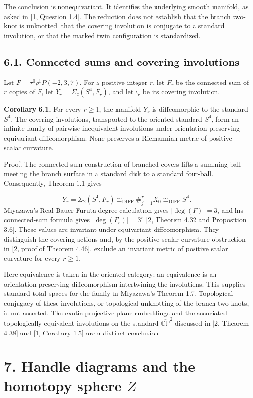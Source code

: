 \documentclass[11pt,letterpaper]{article}
\begin{document}
The conclusion is nonequivariant. It identifies the underlying smooth manifold, as asked in [1, Question 1.4]. The reduction does not establish that the branch two-knot is unknotted, that the covering involution is conjugate to a standard involution, or that the marked twin configuration is standardized.

\subsection*{6.1. Connected sums and covering involutions}
Let $F=\tau^0\rho^1P(-2,3,7)$. For a positive integer $r$, let $F_r$ be the connected sum of $r$ copies of $F$, let $Y_r=\Sigma_2(S^4,F_r)$, and let $\iota_r$ be its covering involution.

\medskip\noindent\textbf{Corollary 6.1.} For every $r\geq1$, the manifold $Y_r$ is diffeomorphic to the standard $S^4$. The covering involutions, transported to the oriented standard $S^4$, form an infinite family of pairwise inequivalent involutions under orientation-preserving equivariant diffeomorphism. None preserves a Riemannian metric of positive scalar curvature.

Proof. The connected-sum construction of branched covers lifts a summing ball meeting the branch surface in a standard disk to a standard four-ball. Consequently, Theorem 1.1 gives

\[
Y_r=\Sigma_2(S^4,F_r)\cong_{\mathrm{DIFF}}\#_{j=1}^{r}X_0\cong_{\mathrm{DIFF}}S^4.
\]
Miyazawa's Real Bauer-Furuta degree calculation gives $|\deg(F)|=3$, and his connected-sum formula gives $|\deg(F_r)|=3^r$ [2, Theorem 4.32 and Proposition 3.6]. These values are invariant under equivariant diffeomorphism. They distinguish the covering actions and, by the positive-scalar-curvature obstruction in [2, proof of Theorem 4.46], exclude an invariant metric of positive scalar curvature for every $r\geq1$.

Here equivalence is taken in the oriented category: an equivalence is an orientation-preserving diffeomorphism intertwining the involutions. This supplies standard total spaces for the family in Miyazawa's Theorem 1.7. Topological conjugacy of these involutions, or topological unknotting of the branch two-knots, is not asserted. The exotic projective-plane embeddings and the associated topologically equivalent involutions on the standard $\overline{\mathbb{CP}}^{2}$ discussed in [2, Theorem 4.38] and [1, Corollary 1.5] are a distinct conclusion.

\section*{7. Handle diagrams and the homotopy sphere $Z$}
\end{document}

